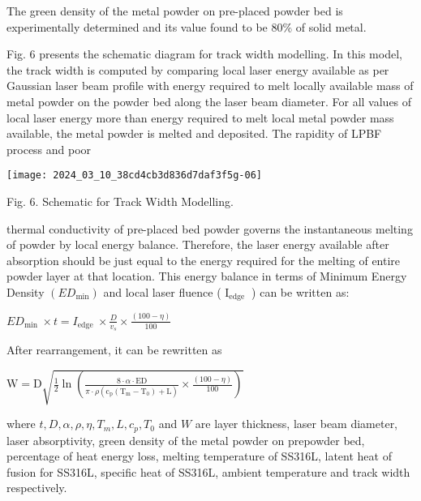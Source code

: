 \documentclass[10pt]{article}
\begin{document}
The green density of the metal powder on pre-placed powder bed is experimentally determined and its value found to be $80 \%$ of solid metal.

Fig. 6 presents the schematic diagram for track width modelling. In this model, the track width is computed by comparing local laser energy available as per Gaussian laser beam profile with energy required to melt locally available mass of metal powder on the powder bed along the laser beam diameter. For all values of local laser energy more than energy required to melt local metal powder mass available, the metal powder is melted and deposited. The rapidity of LPBF process and poor

\begin{center}
\texttt{[image: 2024\_03\_10\_38cd4cb3d836d7daf3f5g-06]}
\end{center}

Fig. 6. Schematic for Track Width Modelling.

thermal conductivity of pre-placed bed powder governs the instantaneous melting of powder by local energy balance. Therefore, the laser energy available after absorption should be just equal to the energy required for the melting of entire powder layer at that location. This energy balance in terms of Minimum Energy Density $\left(E D_{\min }\right)$ and local laser fluence ( $\mathrm{I}_{\text {edge }}$ ) can be written as:

$E D_{\text {min }} \times t=I_{\text {edge }} \times \frac{D}{v_{s}} \times \frac{(100-\eta)}{100}$

After rearrangement, it can be rewritten as

$\mathrm{W}=\mathrm{D} \sqrt{\frac{1}{2} \ln \left(\frac{8 \cdot \alpha \cdot \mathrm{ED}}{\pi \cdot \rho\left(\mathrm{c}_{\mathrm{p}}\left(\mathrm{T}_{\mathrm{m}}-\mathrm{T}_{0}\right)+\mathrm{L}\right)} \times \frac{(100-\eta)}{100}\right)}$

where $t, D, \alpha, \rho, \eta, T_{m}, L, c_{p}, T_{0}$ and $W$ are layer thickness, laser beam diameter, laser absorptivity, green density of the metal powder on prepowder bed, percentage of heat energy loss, melting temperature of SS316L, latent heat of fusion for SS316L, specific heat of SS316L, ambient temperature and track width respectively.
\end{document}
